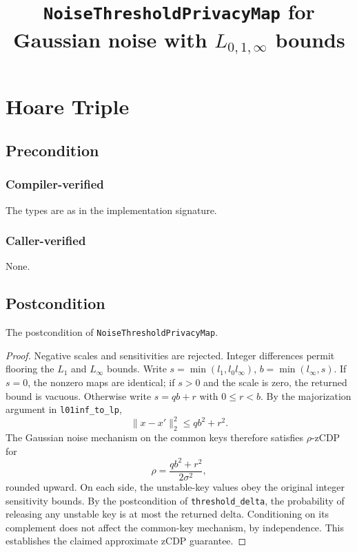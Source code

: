\documentclass{article}
\title{\texttt{NoiseThresholdPrivacyMap} for Gaussian noise with $L_{0,1,\infty}$ bounds}
\author{\MichaelShoemateAuthor}
\begin{document}
\maketitle
\contrib
\section{Hoare Triple}
\subsection*{Precondition}
\subsubsection*{Compiler-verified}
The types are as in the implementation signature.
\subsubsection*{Caller-verified}
None.
\subsection*{Postcondition}
The postcondition of \texttt{NoiseThresholdPrivacyMap}.
\begin{proof}
Negative scales and sensitivities are rejected. Integer differences permit flooring the $L_1$ and $L_\infty$ bounds.
Write $s=\min(l_1,l_0l_\infty)$, $b=\min(l_\infty,s)$.
If $s=0$, the nonzero maps are identical; if $s>0$ and the scale is zero, the returned bound is vacuous.
Otherwise write $s=qb+r$ with $0\le r<b$.
By the majorization argument in \texttt{l01inf\_to\_lp},
\[
\|x-x'\|_2^2\le qb^2+r^2.
\]
The Gaussian noise mechanism on the common keys therefore satisfies $\rho$-zCDP for
\[
\rho=\frac{qb^2+r^2}{2\sigma^2},
\]
rounded upward.
On each side, the unstable-key values obey the original integer sensitivity bounds.
By the postcondition of \texttt{threshold\_delta}, the probability of releasing any unstable key is at most the returned delta.
Conditioning on its complement does not affect the common-key mechanism, by independence.
This establishes the claimed approximate zCDP guarantee.
\end{proof}
\end{document}
